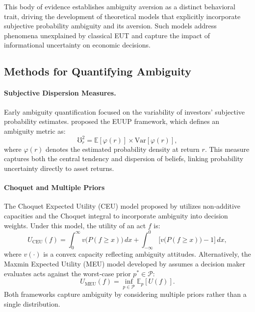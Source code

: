 \documentclass[preprint,12pt,authoryear]{elsarticle}
\begin{document}
This body of evidence establishes ambiguity aversion as a distinct behavioral trait, driving the development of theoretical models that explicitly incorporate subjective probability ambiguity and its aversion. Such models address phenomena unexplained by classical EUT and capture the impact of informational uncertainty on economic decisions.


\subsection{Methods for Quantifying Ambiguity}

\paragraph{Subjective Dispersion Measures.} Early ambiguity quantification focused on the variability of investors' subjective probability estimates. \cite{izhakian2020} proposed the EUUP framework, which defines an ambiguity metric as:
\begin{equation}
\mho^2_r = \mathbb{E}[\varphi(r)] \times \mathrm{Var}[\varphi(r)],
\end{equation}
where $\varphi(r)$ denotes the estimated probability density at return $r$. This measure captures both the central tendency and dispersion of beliefs, linking probability uncertainty directly to asset returns.

\paragraph{Choquet and Multiple Priors} The Choquet Expected Utility (CEU) model proposed by \cite{schmeidler1989} utilizes non‑additive capacities and the Choquet integral to incorporate ambiguity into decision weights. Under this model, the utility of an act $f$ is:
\begin{equation}
U_{\mathrm{CEU}}(f)=\int_0^\infty v\bigl(P(f\ge x)\bigr)\,dx + \int_{-\infty}^0 \bigl[v\bigl(P(f\ge x)\bigr)-1\bigr]\,dx,
\end{equation}
where $v(\cdot)$ is a convex capacity reflecting ambiguity attitudes. Alternatively, the Maxmin Expected Utility (MEU) model developed by \cite{gilboa1989} assumes a decision maker evaluates acts against the worst‑case prior $p^*\in\mathcal{P}$:
\begin{equation}
U_{\mathrm{MEU}}(f)=\inf_{p\in\mathcal{P}}\mathbb{E}_p[U(f)].
\end{equation}
Both frameworks capture ambiguity by considering multiple priors rather than a single distribution.
\end{document}
